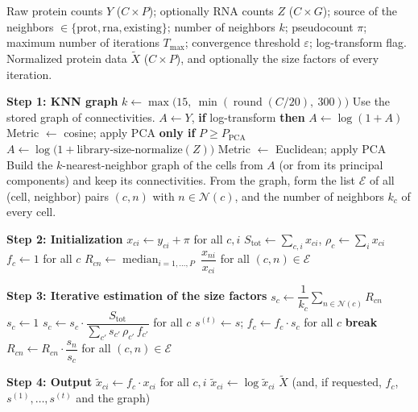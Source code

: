 \documentclass[11pt]{article}
\newcommand{\N}{\mathcal{N}}
\newcommand{\median}{\operatorname{median}}
\begin{document}
\begin{algorithm}[h]
\caption{KNN normalization (\texttt{knn\_normalize})}
\begin{algorithmic}[1]
\Require Raw protein counts $Y$ ($C \times P$); optionally RNA counts $Z$
  ($C \times G$); source of the neighbors $\in \{\text{prot}, \text{rna},
  \text{existing}\}$; number of neighbors $k$; pseudocount $\pi$; maximum
  number of iterations $T_{\max}$; convergence threshold $\varepsilon$;
  log-transform flag.
\Ensure Normalized protein data $\tilde{X}$ ($C \times P$), and optionally the
  size factors of every iteration.

\Statex
\Statex \textbf{Step 1: KNN graph}
  \State $k \gets \max\bigl(15,\ \min(\operatorname{round}(C/20),\ 300)\bigr)$
\EndIf
{}
  \State Use the stored graph of connectivities.
\Else
    \State $A \gets Y$, \textbf{if} log-transform \textbf{then} $A \gets \log(1 + A)$
    \State Metric $\gets$ cosine; apply PCA \textbf{only if} $P \ge P_{\text{PCA}}$
  \Else
    \State $A \gets \log\bigl(1 + \text{library-size-normalize}(Z)\bigr)$
    \State Metric $\gets$ Euclidean; apply PCA
  \EndIf
  \State Build the $k$-nearest-neighbor graph of the cells from $A$ (or from its
    principal components) and keep its connectivities.
\EndIf
\State From the graph, form the list $\mathcal{E}$ of all (cell, neighbor) pairs
  $(c, n)$ with $n \in \N(c)$, and the number of neighbors $k_c$ of every cell.

\Statex
\Statex \textbf{Step 2: Initialization}
\State $x_{ci} \gets y_{ci} + \pi$ for all $c, i$
\State $S_{\text{tot}} \gets \sum_{c,i} x_{ci}$, \quad
  $\rho_c \gets \sum_{i} x_{ci}$
\State $f_c \gets 1$ for all $c$ 
\State $R_{cn} \gets \median_{i=1,\dots,P}\ \dfrac{x_{ni}}{x_{ci}}$
  for all $(c,n) \in \mathcal{E}$

\Statex
\Statex \textbf{Step 3: Iterative estimation of the size factors}
      \State $s_c \gets \dfrac{1}{k_c} \sum_{n \in \N(c)} R_{cn}$
    \Else
      \State $s_c \gets 1$
    \EndIf
  \EndFor
  \State $s_c \gets s_c \cdot \dfrac{S_{\text{tot}}}{\sum_{c'} s_{c'}\, \rho_{c'}\, f_{c'}}$
    for all $c$
  \State $s^{(t)} \gets s$; \quad $f_c \gets f_c \cdot s_c$ for all $c$
    \State \textbf{break}
  \EndIf
  \State $R_{cn} \gets R_{cn} \cdot \dfrac{s_n}{s_c}$ for all $(c,n) \in
    \mathcal{E}$ 
\EndFor

\Statex
\Statex \textbf{Step 4: Output}
\State $\tilde{x}_{ci} \gets f_c \cdot x_{ci}$ for all $c, i$
  \State $\tilde{x}_{ci} \gets \log \tilde{x}_{ci}$
\EndIf
\State \Return $\tilde{X}$ (and, if requested, $f_c$, $s^{(1)}, \dots, s^{(t)}$ and the graph)
\end{algorithmic}
\end{algorithm}
\end{document}
